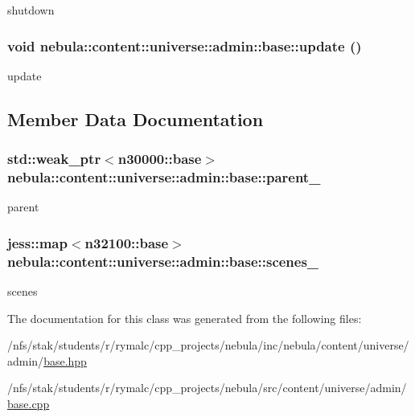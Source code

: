 shutdown \hypertarget{classnebula_1_1content_1_1universe_1_1admin_1_1base_aa8a9cc5f94b9d0f4eda45c6d8843a242}{
\subsubsection[{update}]{\setlength{\rightskip}{0pt plus 5cm}void nebula::content::universe::admin::base::update ()}}
\label{classnebula_1_1content_1_1universe_1_1admin_1_1base_aa8a9cc5f94b9d0f4eda45c6d8843a242}


update 

\subsection{Member Data Documentation}
\hypertarget{classnebula_1_1content_1_1universe_1_1admin_1_1base_a85bfa37d873de311c7dae48064586698}{
\subsubsection[{parent\_\-}]{\setlength{\rightskip}{0pt plus 5cm}std::weak\_\-ptr$<${\bf n30000::base}$>$ {\bf nebula::content::universe::admin::base::parent\_\-}}}
\label{classnebula_1_1content_1_1universe_1_1admin_1_1base_a85bfa37d873de311c7dae48064586698}


parent \hypertarget{classnebula_1_1content_1_1universe_1_1admin_1_1base_a5c7a0e365fdf2bec2f46f20265e55af1}{
\subsubsection[{scenes\_\-}]{\setlength{\rightskip}{0pt plus 5cm}jess::map$<${\bf n32100::base}$>$ {\bf nebula::content::universe::admin::base::scenes\_\-}}}
\label{classnebula_1_1content_1_1universe_1_1admin_1_1base_a5c7a0e365fdf2bec2f46f20265e55af1}


scenes 

The documentation for this class was generated from the following files:\begin{DoxyCompactItemize}
\item 
/nfs/stak/students/r/rymalc/cpp\_\-projects/nebula/inc/nebula/content/universe/admin/\hyperlink{inc_2nebula_2content_2universe_2admin_2base_8hpp}{base.hpp}\item 
/nfs/stak/students/r/rymalc/cpp\_\-projects/nebula/src/content/universe/admin/\hyperlink{src_2content_2universe_2admin_2base_8cpp}{base.cpp}\end{DoxyCompactItemize}

